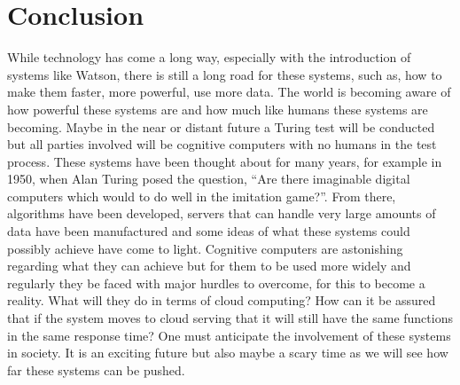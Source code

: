 \documentclass[journal]{IEEEtran}
\begin{document}
\section{Conclusion}
While technology has come a long way, especially with the introduction of systems like Watson, there is still a long road for these systems, such as, how to make them faster, more powerful, use more data. The world is becoming aware of how powerful these systems are and how much like humans these systems are becoming. Maybe in the near or distant future a Turing test will be conducted but all parties involved will be cognitive computers with no humans in the test process. These systems have been thought about for many years, for example in 1950, when Alan Turing posed the question, “Are there imaginable digital computers which would to do well in the imitation game?”. From there, algorithms have been developed, servers that can handle very large amounts of data have been manufactured and some ideas of what these systems could possibly achieve have come to light. Cognitive computers are astonishing regarding what they can achieve but for them to be used more widely and regularly they be faced with major hurdles to overcome, for this to become a reality. What will they do in terms of cloud computing? How can it be assured that if the system moves to cloud serving that it will still have the same functions in the same response time? One must anticipate the involvement of these systems in society. It is an exciting future but also maybe a scary time as we will see how far these systems can be pushed.


\printbibliography
\end{document}
